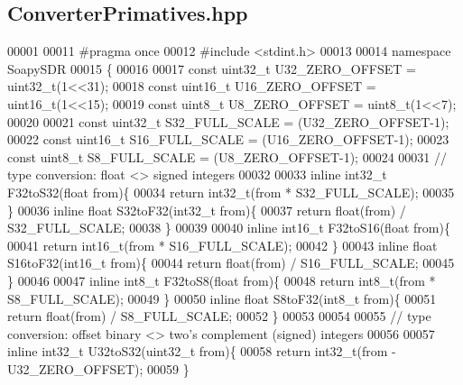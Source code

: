 \subsection{Converter\+Primatives.\+hpp}
\label{ConverterPrimatives_8hpp_source}

\begin{DoxyCode}
00001 
00011 \textcolor{preprocessor}{#pragma once}
00012 \textcolor{preprocessor}{#include <stdint.h>}
00013 
00014 \textcolor{keyword}{namespace }SoapySDR
00015 \{
00016   
00017 \textcolor{keyword}{const} uint32\_t U32_ZERO_OFFSET = uint32\_t(1<<31);
00018 \textcolor{keyword}{const} uint16\_t U16_ZERO_OFFSET = uint16\_t(1<<15);
00019 \textcolor{keyword}{const} uint8\_t   U8_ZERO_OFFSET =  uint8\_t(1<<7);
00020 
00021 \textcolor{keyword}{const} uint32\_t S32_FULL_SCALE = (U32\_ZERO\_OFFSET-1);
00022 \textcolor{keyword}{const} uint16\_t S16_FULL_SCALE = (U16\_ZERO\_OFFSET-1);
00023 \textcolor{keyword}{const} uint8\_t   S8_FULL_SCALE =  (U8\_ZERO\_OFFSET-1);
00024   
00031 \textcolor{comment}{// type conversion: float <> signed integers}
00032 
00033 \textcolor{keyword}{inline} int32\_t F32toS32(\textcolor{keywordtype}{float} from)\{
00034   \textcolor{keywordflow}{return} int32\_t(from * S32\_FULL\_SCALE);
00035 \}
00036 \textcolor{keyword}{inline} \textcolor{keywordtype}{float} S32toF32(int32\_t from)\{
00037   \textcolor{keywordflow}{return} float(from) / S32_FULL_SCALE;
00038 \}
00039 
00040 \textcolor{keyword}{inline} int16\_t F32toS16(\textcolor{keywordtype}{float} from)\{
00041   \textcolor{keywordflow}{return} int16\_t(from * S16\_FULL\_SCALE);
00042 \}
00043 \textcolor{keyword}{inline} \textcolor{keywordtype}{float} S16toF32(int16\_t from)\{
00044   \textcolor{keywordflow}{return} float(from) / S16_FULL_SCALE;
00045 \}
00046 
00047 \textcolor{keyword}{inline} int8\_t F32toS8(\textcolor{keywordtype}{float} from)\{
00048   \textcolor{keywordflow}{return} int8\_t(from * S8\_FULL\_SCALE);
00049 \}
00050 \textcolor{keyword}{inline} \textcolor{keywordtype}{float} S8toF32(int8\_t from)\{
00051   \textcolor{keywordflow}{return} float(from) / S8_FULL_SCALE;
00052 \}
00053 
00054 
00055 \textcolor{comment}{// type conversion: offset binary <> two's complement (signed) integers}
00056 
00057 \textcolor{keyword}{inline} int32\_t U32toS32(uint32\_t from)\{
00058   \textcolor{keywordflow}{return} int32\_t(from - U32\_ZERO\_OFFSET);
00059 \}

\end{DoxyCode}
